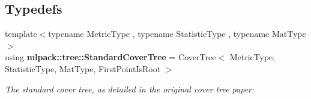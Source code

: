 \subsection*{Typedefs}
\begin{DoxyCompactItemize}
\item 
{\footnotesize template$<$typename Metric\+Type , typename Statistic\+Type , typename Mat\+Type $>$ }\\using {\bf mlpack\+::tree\+::\+Standard\+Cover\+Tree} = Cover\+Tree$<$ Metric\+Type, Statistic\+Type, Mat\+Type, First\+Point\+Is\+Root $>$
\begin{DoxyCompactList}\small\item\em The standard cover tree, as detailed in the original cover tree paper\+: \end{DoxyCompactList}\end{DoxyCompactItemize}
